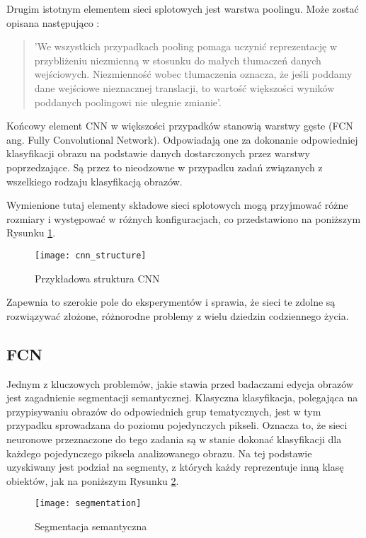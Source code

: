     Drugim istotnym elementem sieci splotowych jest warstwa poolingu. Może zostać opisana następująco \cite{pooling}:
    \begin{quote}
      'We wszystkich przypadkach pooling pomaga uczynić reprezentację w przybliżeniu niezmienną w stosunku do małych tłumaczeń danych wejściowych. Niezmienność wobec tłumaczenia oznacza, że jeśli poddamy dane wejściowe nieznacznej translacji, to wartość większości wyników poddanych poolingowi nie ulegnie zmianie'.
    \end{quote}

    Końcowy element CNN w większości przypadków stanowią warstwy gęste (FCN ang. Fully Convolutional Network). Odpowiadają one za dokonanie odpowiedniej klasyfikacji obrazu na podstawie danych dostarczonych przez warstwy poprzedzające. Są przez to nieodzowne w przypadku zadań związanych z wszelkiego rodzaju klasyfikacją obrazów.

    Wymienione tutaj elementy składowe sieci splotowych mogą przyjmować różne rozmiary i występować w różnych konfiguracjach, co przedstawiono na poniższym Rysunku \ref{fig:cnn_structure}.
    \begin{figure}[h]
     \centering
     \texttt{[image: cnn\_structure]}
     \caption{Przykładowa struktura CNN}
     \label{fig:cnn_structure}
    \end{figure}
    \newline
    Zapewnia to szerokie pole do eksperymentów i sprawia, że sieci te zdolne są rozwiązywać złożone, różnorodne problemy z wielu dziedzin codziennego życia.

  \subsection{FCN}

   Jednym z kluczowych problemów, jakie stawia przed badaczami edycja obrazów jest zagadnienie segmentacji semantycznej. Klasyczna klasyfikacja, polegająca na przypisywaniu obrazów do odpowiednich grup tematycznych, jest w tym przypadku sprowadzana do poziomu pojedynczych pikseli. Oznacza to, że sieci neuronowe przeznaczone do tego zadania są w stanie dokonać klasyfikacji dla każdego pojedynczego piksela analizowanego obrazu. Na tej podstawie uzyskiwany jest podział na segmenty, z których każdy reprezentuje inną klasę obiektów, jak na poniższym Rysunku \ref{fig:segmentation}.

   \begin{figure}[h]
    \centering
    \texttt{[image: segmentation]}
    \caption{Segmentacja semantyczna}
    \label{fig:segmentation}
  \end{figure}

